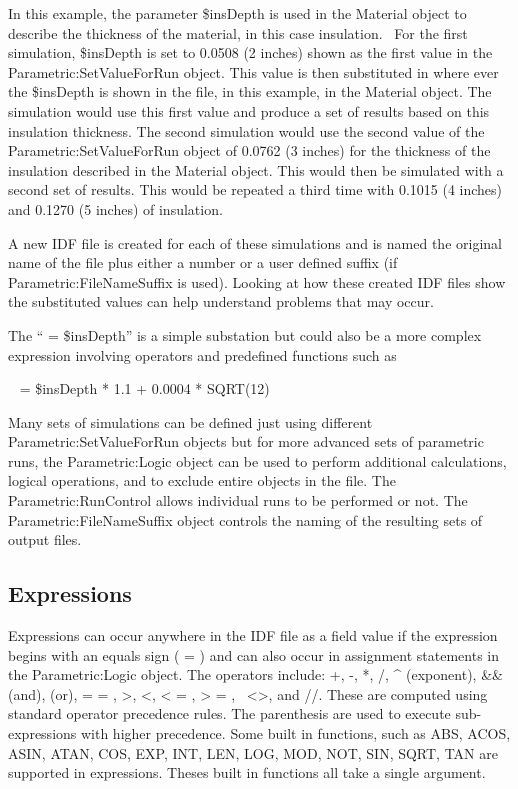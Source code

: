 In this example, the parameter \$insDepth is used in the Material object to describe the thickness of the material, in this case insulation.~ For the first simulation, \$insDepth is set to 0.0508 (2 inches) shown as the first value in the Parametric:SetValueForRun object. This value is then substituted in where ever the \$insDepth is shown in the file, in this example, in the Material object. The simulation would use this first value and produce a set of results based on this insulation thickness. The second simulation would use the second value of the Parametric:SetValueForRun object of 0.0762 (3 inches) for the thickness of the insulation described in the Material object. This would then be simulated with a second set of results. This would be repeated a third time with 0.1015 (4 inches) and 0.1270 (5 inches) of insulation.

A new IDF file is created for each of these simulations and is named the original name of the file plus either a number or a user defined suffix (if Parametric:FileNameSuffix is used). Looking at how these created IDF files show the substituted values can help understand problems that may occur.

The `` = \$insDepth'' is a simple substation but could also be a more complex expression involving operators and predefined functions such as

~ = \$insDepth * 1.1 + 0.0004 * SQRT(12)

Many sets of simulations can be defined just using different Parametric:SetValueForRun objects but for more advanced sets of parametric runs, the Parametric:Logic object can be used to perform additional calculations, logical operations, and to exclude entire objects in the file. The Parametric:RunControl allows individual runs to be performed or not. The Parametric:FileNameSuffix object controls the naming of the resulting sets of output files.

\subsection{Expressions}\label{expressions}

Expressions can occur anywhere in the IDF file as a field value if the expression begins with an equals sign ( = ) and can also occur in assignment statements in the Parametric:Logic object. The operators include: +, -, *, /, \^{} (exponent), \&\& (and), \textbar{}\textbar{} (or), = = , \textgreater{}, \textless{}, \textless{} = , \textgreater{} = ,~ \textless{}\textgreater{}, and //. These are computed using standard operator precedence rules. The parenthesis are used to execute sub-expressions with higher precedence. Some built in functions, such as ABS, ACOS, ASIN, ATAN, COS, EXP, INT, LEN, LOG, MOD, NOT, SIN, SQRT, TAN are supported in expressions. Theses built in functions all take a single argument.

